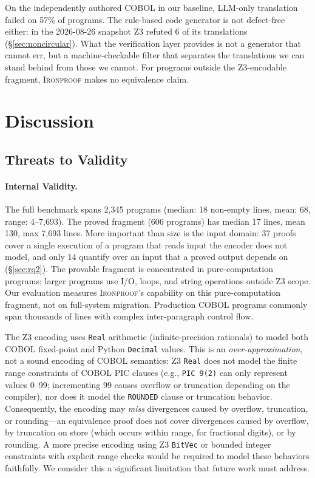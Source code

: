 \documentclass[sigconf,nonacm]{acmart}
\begin{document}
On the independently authored COBOL in our baseline, LLM-only translation failed on 57\% of programs. The rule-based code generator is not defect-free either: in the 2026-08-26 snapshot Z3 refuted 6 of its translations (\S\ref{sec:noncircular}). What the verification layer provides is not a generator that cannot err, but a machine-checkable filter that separates the translations we can stand behind from those we cannot. For programs outside the Z3-encodable fragment, \textsc{Ironproof} makes no equivalence claim.


\section{Discussion}\label{sec:discussion}

\subsection{Threats to Validity}

\paragraph{Internal Validity.} The full benchmark spans 2{,}345 programs (median: 18 non-empty lines, mean: 68, range: 4--7{,}693). The proved fragment (606 programs) has median 17 lines, mean 130, max 7{,}693 lines. More important than size is the input domain: 37 proofs cover a single execution of a program that reads input the encoder does not model, and only 14 quantify over an input that a proved output depends on (\S\ref{sec:rq2}). The provable fragment is concentrated in pure-computation programs; larger programs use I/O, loops, and string operations outside Z3 scope. Our evaluation measures \textsc{Ironproof}'s capability on this pure-computation fragment, not on full-system migration. Production COBOL programs commonly span thousands of lines with complex inter-paragraph control flow.

The Z3 encoding uses \texttt{Real} arithmetic (infinite-precision rationals) to model both COBOL fixed-point and Python \texttt{Decimal} values. This is an \emph{over-approximation}, not a sound encoding of COBOL semantics: Z3 \texttt{Real} does not model the finite range constraints of COBOL PIC clauses (e.g., \texttt{PIC 9(2)} can only represent values 0--99; incrementing 99 causes overflow or truncation depending on the compiler), nor does it model the \texttt{ROUNDED} clause or truncation behavior. Consequently, the encoding may \emph{miss} divergences caused by overflow, truncation, or rounding---an equivalence proof does not cover divergences caused by overflow, by truncation on store (which occurs within range, for fractional digits), or by rounding. A more precise encoding using Z3 \texttt{BitVec} or bounded integer constraints with explicit range checks would be required to model these behaviors faithfully. We consider this a significant limitation that future work must address.
\end{document}
